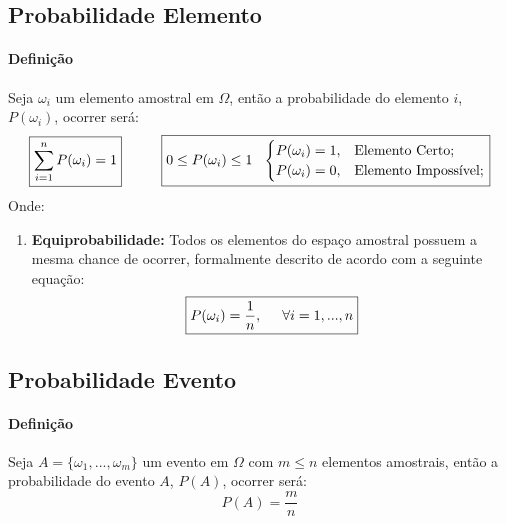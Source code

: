 \documentclass{article}
\begin{document}
        \subsection{Probabilidade Elemento}
            \paragraph{Definição}Seja $\omega_{i}$ um elemento amostral em $\Omega$, então a probabilidade do elemento $i$, $P(\omega_{i})$, ocorrer será:
                \begin{equation}
                    \boxed{
                        \sum_{i=1}^{n} P(\omega_{i}) = 1
                    }
                    \hspace{10mm}
                    \boxed{
                        0 \le P(\omega_{i}) \le 1
                        \hspace{2.5mm}
                        \begin{cases}
                            P(\omega_{i}) = 1, & \text{Elemento Certo};\\
                            P(\omega_{i}) = 0, & \text{Elemento Impossível};
                        \end{cases}
                    }
                    \end{equation}
            Onde:
                \begin{enumerate}[rightmargin = \leftmargin, noitemsep]
                    \item \textbf{Equiprobabilidade:} Todos os elementos do espaço amostral possuem a mesma chance de ocorrer, formalmente descrito de acordo com a seguinte equação:
                        \begin{equation}
                            \boxed{
                                P(\omega_{i}) = \frac{1}{n},
                                \hspace{5mm}
                                \forall i = 1, ..., n
                            }
                        \end{equation}
                \end{enumerate}

        \subsection{Probabilidade Evento}
            \paragraph{Definição}Seja $A = \{ \omega_{1}, ..., \omega_{m} \}$ um evento em $\Omega$ com $m \le n$ elementos amostrais, então a probabilidade do evento $A$, $P(A)$, ocorrer será:
                \begin{equation}
                    \boxed{
                        P(A) = \frac{m}{n}
                    }
                \end{equation}
\end{document}
